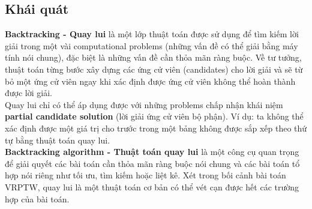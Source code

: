 \documentclass[12pt,a4paper]{article}\author{Nguyễn Nho Dũng}
\newcommand{\kniem}[1]{{\sffamily\bfseries #1}}
\begin{document}
\subsection{Khái quát}
\kniem{Backtracking - Quay lui} là một lớp thuật toán được sử dụng để tìm kiếm lời giải trong một vài computational problems (những vấn đề có thể giải bằng máy tính nói chung), đặc biệt là những vấn đề cần thỏa mãn ràng buộc. Về tư tưởng, thuật toán từng bước xây dựng các ứng cử viên (candidates) cho lời giải và sẽ từ bỏ một ứng cử viên ngay khi xác định được ứng cử viên không thể hoàn thành được lời giải.\\[5pt]
Quay lui chỉ có thể áp dụng được với những problems chấp nhận khái niệm \kniem{partial candidate solution} (lời giải ứng cử viên bộ phận). Ví dụ: ta không thể xác định được một giá trị cho trước trong một bảng không được sắp xếp theo thứ tự bằng thuật toán quay lui.\\[5pt]
\kniem{Backtracking algorithm - Thuật toán quay lui} là một công cụ quan trọng để giải quyết các bài toán cần thỏa mãn ràng buộc nói chung và các bài toán tổ hợp nói riêng như tối ưu, tìm kiếm hoặc liệt kê. Xét trong bối cảnh bài toán VRPTW, quay lui là một thuật toán cơ bản có thể vét cạn được hết các trường hợp của bài toán.
\end{document}
